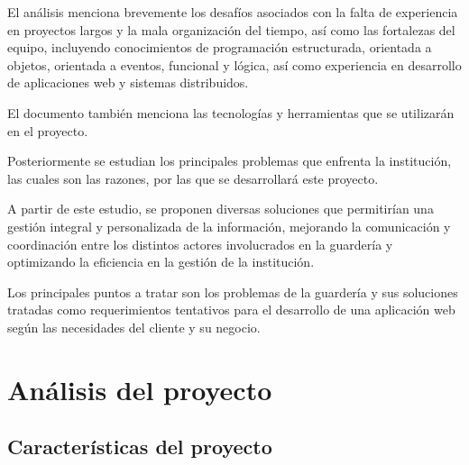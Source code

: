 \documentclass{article}
\begin{document}
El análisis menciona brevemente los desafíos asociados con la falta de experiencia en proyectos largos y la mala organización del tiempo, así como las fortalezas del equipo, incluyendo conocimientos de programación estructurada, orientada a objetos, orientada a eventos, funcional y lógica, así como experiencia en desarrollo de aplicaciones web y sistemas distribuidos.

El documento también menciona las tecnologías y herramientas que se utilizarán en el proyecto.

Posteriormente se estudian los principales problemas que enfrenta la institución, las cuales son las razones, por las que se desarrollará este proyecto.

A partir de este estudio, se proponen diversas soluciones que permitirían una gestión integral y personalizada de la información, mejorando la comunicación y coordinación entre los distintos actores involucrados en la guardería y optimizando la eficiencia en la gestión de la institución.

Los principales puntos a tratar son los problemas de la guardería y sus soluciones tratadas como requerimientos tentativos para el desarrollo de una aplicación web según las necesidades del cliente y su negocio.

\section{Análisis del proyecto}
\subsection{Características del proyecto}
\end{document}
